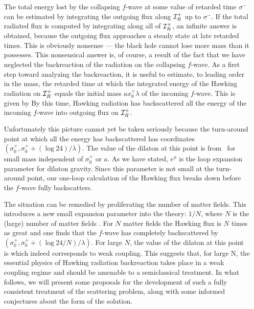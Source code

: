 The total energy lost by the collapsing $f$-wave at some value of
retarded time $\sigma^-$ can be estimated by integrating the outgoing flux
along ${\cal I}^+_R$ up to $\sigma^-$. If the total radiated flux is computed
by
integrating along all of ${\cal I}^+_R$, an infinite answer is obtained,
because
the outgoing flux approaches a steady state at late retarded times.  This
is obviously nonsense --- the black hole cannot lose more mass than it
possesses.  This nonsensical answer is, of course, a result of the fact that
we have neglected the backreaction of the radiation on the collapsing
$f$-wave.  As a first step toward analyzing the backreaction, it is
useful to estimate, to leading order in the
mass, the retarded time at which the
integrated energy of the Hawking radiation on ${\cal I}^+_R$ equals the initial
mass $ax_0^+\lambda$ of the incoming $f$-wave.  This is given by
%
\eqn{}
%
By this time, Hawking radiation has backscattered
all the energy of the incoming $f$-wave into outgoing flux on ${\cal I}^+_R$.

Unfortunately this picture cannot yet be taken seriously because
the turn-around point at which all the energy has backscattered has coordinates
$(\sigma_0^+ , \sigma_0^+ + (\log 24)/\lambda)$.
The value of the dilaton at this point is from \thirteen\ for small mass
%
\eqn{}
%
independent of $\sigma^+_0$ or $a$.   As we have stated,
$e^\phi$ is the loop expansion parameter for dilaton
gravity.  Since this parameter  is not small at the turn-around point,
our one-loop calculation
of the Hawking flux breaks down before the $f$-wave fully
backscatters.

The situation can be remedied by proliferating the number of matter fields.
This introduces a new small expansion parameter into the theory:
$1/N$, where $N$ is the (large) number of matter fields \tomb.
For $N$ matter fields the Hawking flux is $N$ times as
great and one finds that the $f$-wave has completely backscattered by
$ (\sigma_0^+ , \sigma_0^+ + (\log 24/N)/\lambda )$.
For large $N$, the value of the dilaton at this point is
%
\eqn{}
%
which indeed corresponds to weak coupling. This suggests that, for large N,
the essential physics of Hawking radiation backreaction takes place in a
weak coupling regime and should be amenable to a semiclassical treatment.
In what follows, we will present some proposals for the development of
such a fully consistent treatment of the scattering problem, along with
some informed conjectures about the form of the solution.


